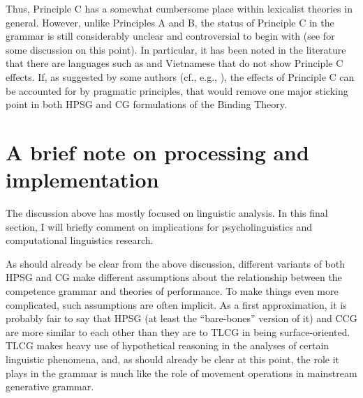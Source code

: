 \documentclass[output=paper
                ,modfonts
 	        ,biblatex
                ,babelshorthands
                ,newtxmath
                ,draftmode
                ,colorlinks, citecolor=brown
]{langscibook}
\begin{document}

Thus, Principle C has a somewhat cumbersome place within lexicalist
theories in general. However, unlike Principles A and B, the status of
Principle C in the grammar is still considerably unclear and
controversial to begin with (see \citealt[122--124]{buringbinding} for
some discussion on this point). In particular, it has been noted in
the literature \citep{lasnik86} that there are languages such as 
and Vietnamese that do not show Principle C effects. If, as suggested
by some authors (cf., e.g., \citealt{levinson87,levinson91}), the
effects of Principle C can be accounted for by pragmatic principles,
that would remove one major sticking point in both HPSG and CG
formulations of the Binding Theory.


\section{A brief note on processing and implementation \label{implementation}}

The discussion above has mostly focused on linguistic analysis. In
this final section, I will briefly comment on implications for
psycholinguistics and computational linguistics research.

As should already be clear from the above discussion, different
variants of both HPSG and CG make different assumptions
about the relationship between the competence grammar and theories of
performance. To make things even more complicated, such assumptions
are often implicit. As a first approximation, it is probably fair to
say that HPSG (at least the ``bare-bones'' version of it) and CCG are
more similar to each other than they are to TLCG in being
surface-oriented. TLCG makes heavy use of hypothetical reasoning in
the analyses of certain linguistic phenomena, and, as should already
be clear at this point, the role it plays in the grammar is much like
the role of movement operations in mainstream generative grammar.
\end{document}
